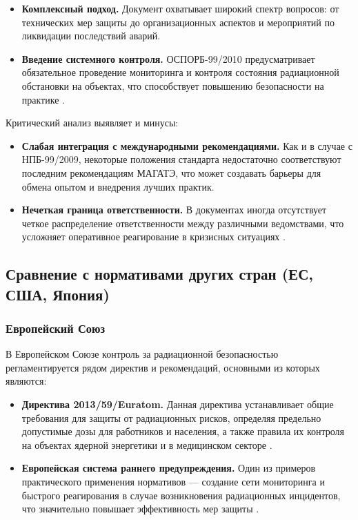 \documentclass[a4paper, 14pt]{extarticle}
\begin{document}
\begin{itemize}
    \item \textbf{Комплексный подход.} Документ охватывает широкий спектр вопросов: от технических мер защиты до организационных аспектов и мероприятий по ликвидации последствий аварий.

    \item \textbf{Введение системного контроля.} ОСПОРБ-99/2010 предусматривает обязательное проведение мониторинга и контроля состояния радиационной обстановки на объектах, что способствует повышению безопасности на практике \cite{8}.
\end{itemize}

Критический анализ выявляет и минусы:

\begin{itemize}
    \item \textbf{Слабая интеграция с международными рекомендациями.} Как и в случае с НПБ-99/2009, некоторые положения стандарта недостаточно соответствуют последним рекомендациям МАГАТЭ, что может создавать барьеры для обмена опытом и внедрения лучших практик.

    \item \textbf{Нечеткая граница ответственности.} В документах иногда отсутствует четкое распределение ответственности между различными ведомствами, что усложняет оперативное реагирование в кризисных ситуациях \cite{9}.
\end{itemize}

\subsection{Сравнение с нормативами других стран (ЕС, США, Япония)}

\subsubsection{Европейский Союз}

В Европейском Союзе контроль за радиационной безопасностью регламентируется рядом директив и рекомендаций, основными из которых являются:

\begin{itemize}
    \item \textbf{Директива 2013/59/Euratom.} Данная директива устанавливает общие требования для защиты от радиационных рисков, определяя предельно допустимые дозы для работников и населения, а также правила их контроля на объектах ядерной энергетики и в медицинском секторе \cite{6}.

    \item \textbf{Европейская система раннего предупреждения.} Один из примеров практического применения нормативов — создание сети мониторинга и быстрого реагирования в случае возникновения радиационных инцидентов, что значительно повышает эффективность мер защиты \cite{7}.
\end{itemize}
\end{document}
